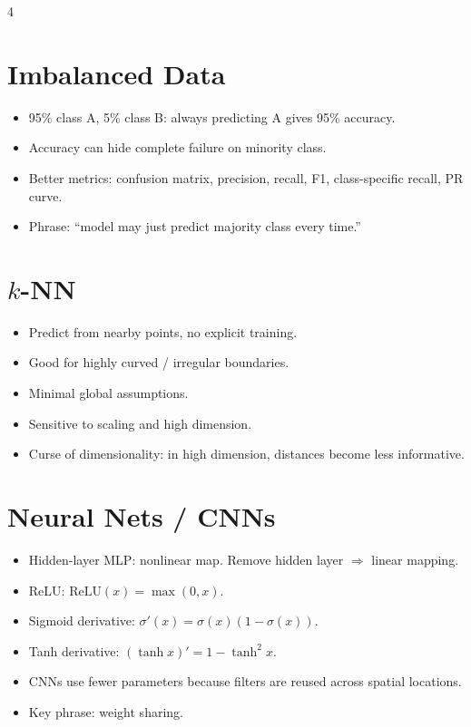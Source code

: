 \documentclass[11pt,landscape]{article}
\newcommand{\relu}{\mathrm{ReLU}}
\begin{document}
\begin{multicols}{4}
		\section{Imbalanced Data}
		\begin{itemize}
			\item 95\% class A, 5\% class B: always predicting A gives 95\% accuracy.
			\item Accuracy can hide complete failure on minority class.
			\item Better metrics: confusion matrix, precision, recall, F1, class-specific recall, PR curve.
			\item Phrase: ``model may just predict majority class every time.''
		\end{itemize}
		
		\section{$k$-NN}
		\begin{itemize}
			\item Predict from nearby points, no explicit training.
			\item Good for highly curved / irregular boundaries.
			\item Minimal global assumptions.
			\item Sensitive to scaling and high dimension.
			\item Curse of dimensionality: in high dimension, distances become less informative.
		\end{itemize}
		
		\section{Neural Nets / CNNs}
		\begin{itemize}
			\item Hidden-layer MLP: nonlinear map. Remove hidden layer $\Rightarrow$ linear mapping.
			\item ReLU: $\relu(x)=\max(0,x)$.
			\item Sigmoid derivative: $\sigma'(x)=\sigma(x)(1-\sigma(x))$.
			\item Tanh derivative: $(\tanh x)'=1-\tanh^2 x$.
			\item CNNs use fewer parameters because filters are reused across spatial locations.
			\item Key phrase: weight sharing.
		\end{itemize}
		

\end{multicols}
\end{document}
